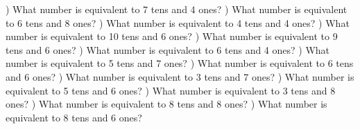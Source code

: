 \documentclass{article}%
\begin{document}
\newline%
\newline%
) What number is equivalent to 7 tens and 4 ones?%
\newline%
\newline%
) What number is equivalent to 6 tens and 8 ones?%
\newline%
\newline%
) What number is equivalent to 4 tens and 4 ones?%
\newline%
\newline%
) What number is equivalent to 10 tens and 6 ones?%
\newline%
\newline%
) What number is equivalent to 9 tens and 6 ones?%
\newline%
\newline%
) What number is equivalent to 6 tens and 4 ones?%
\newline%
\newline%
) What number is equivalent to 5 tens and 7 ones?%
\newline%
\newline%
) What number is equivalent to 6 tens and 6 ones?%
\newline%
\newline%
) What number is equivalent to 3 tens and 7 ones?%
\newline%
\newline%
) What number is equivalent to 5 tens and 6 ones?%
\newline%
\newline%
) What number is equivalent to 3 tens and 8 ones?%
\newline%
\newline%
) What number is equivalent to 8 tens and 8 ones?%
\newline%
\newline%
) What number is equivalent to 8 tens and 6 ones?%
\end{document}
